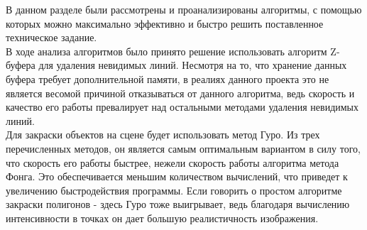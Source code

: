 В данном разделе были рассмотрены и проанализированы алгоритмы, с помощью которых можно максимально эффективно и быстро решить поставленное техническое задание.\\

В ходе анализа алгоритмов было принято решение использовать алгоритм Z-буфера для удаления невидимых линий. Несмотря на то, что хранение данных буфера требует дополнительной памяти, в реалиях данного проекта это не является весомой причиной отказываться от данного алгоритма, ведь скорость и качество его работы превалирует над остальными методами удаления невидимых линий.\\

Для закраски объектов на сцене будет использовать метод Гуро. Из трех перечисленных методов, он является самым оптимальным вариантом в силу того, что скорость его работы быстрее, нежели скорость работы алгоритма метода Фонга. Это обеспечивается меньшим количеством вычислений, что приведет к увеличению быстродействия программы. Если говорить о простом алгоритме закраски полигонов - здесь Гуро тоже выигрывает, ведь благодаря вычислению интенсивности в точках он дает большую реалистичность изображения.\\